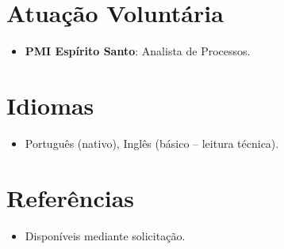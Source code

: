 \documentclass[11pt,a4paper,sans]{moderncv}
\begin{document}

\section{Atuação Voluntária}
\vspace{1pt}
\begin{itemize}
\item {\textbf{PMI Espírito Santo}: Analista de Processos.}
\end{itemize}


\section{Idiomas}
\vspace{1pt}
\begin{itemize}
\item {Português (nativo), Inglês (básico -- leitura técnica).}
\end{itemize}


\section{Referências}
\vspace{1pt}
\begin{itemize}
\item{Disponíveis mediante solicitação.}
\end{itemize}
\end{document}
